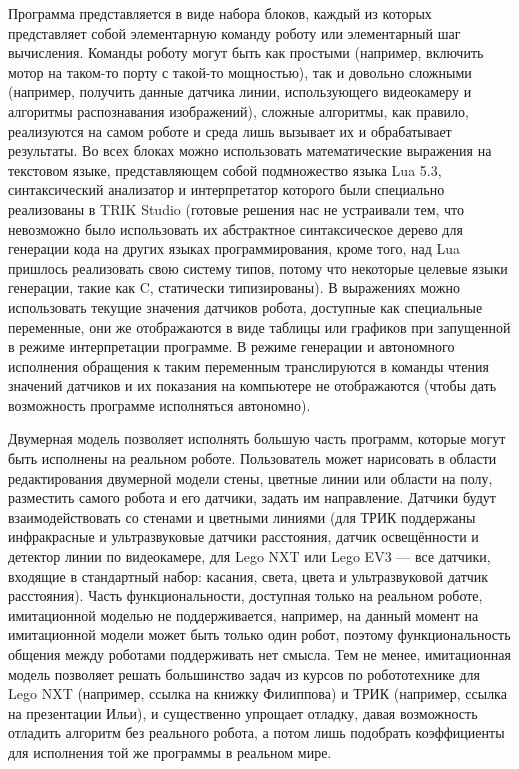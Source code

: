 \documentclass[conference]{IEEEtran}
\begin{document}
Программа представляется в виде набора блоков, каждый из которых представляет собой 
элементарную команду роботу или элементарный шаг вычисления. Команды роботу могут 
быть как простыми (например, включить мотор на таком-то порту с такой-то мощностью), 
так и довольно сложными (например, получить данные датчика линии, использующего видеокамеру 
и алгоритмы распознавания изображений), сложные алгоритмы, как правило, реализуются 
на самом роботе и среда лишь вызывает их и обрабатывает результаты. Во всех блоках 
можно использовать математические выражения на текстовом языке, представляющем собой 
подмножество языка Lua 5.3, синтаксический анализатор и интерпретатор которого были 
специально реализованы в TRIK Studio (готовые решения нас не устраивали тем, что невозможно 
было использовать их абстрактное синтаксическое дерево для генерации кода на других 
языках программирования, кроме того, над Lua пришлось реализовать свою систему типов, 
потому что некоторые целевые языки генерации, такие как C, статически типизированы). 
В выражениях можно использовать текущие значения датчиков робота, доступные как специальные 
переменные, они же отображаются в виде таблицы или графиков при запущенной в режиме 
интерпретации программе. В режиме генерации и автономного исполнения обращения к 
таким переменным транслируются в команды чтения значений датчиков и их показания на 
компьютере не отображаются (чтобы дать возможность программе исполняться автономно).

Двумерная модель позволяет исполнять большую часть программ, которые могут быть исполнены 
на реальном роботе. Пользователь может нарисовать в области редактирования двумерной 
модели стены, цветные линии или области на полу, разместить самого робота и его датчики, 
задать им направление. Датчики будут взаимодействовать со стенами и цветными линиями 
(для ТРИК поддержаны инфракрасные и ультразвуковые датчики расстояния, датчик освещённости 
и детектор линии по видеокамере, для Lego NXT или Lego EV3 --- все датчики, входящие 
в стандартный набор: касания, света, цвета и ультразвуковой датчик расстояния). Часть 
функциональности, доступная только на реальном роботе, имитационной моделью не поддерживается, 
например, на данный момент на имитационной модели может быть только один робот, поэтому 
функциональность общения между роботами поддерживать нет смысла. Тем не менее, имитационная 
модель позволяет решать большинство задач из курсов по робототехнике для Lego NXT (например, 
ссылка на книжку Филиппова) и ТРИК (например, ссылка на презентации Ильи), и существенно 
упрощает отладку, давая возможность отладить алгоритм без реального робота, а потом 
лишь подобрать коэффициенты для исполнения той же программы в реальном мире.
\end{document}
